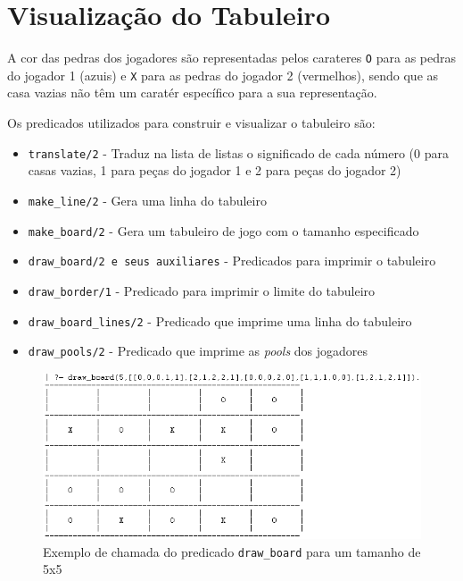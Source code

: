 \documentclass[a4paper]{article}
\begin{document}
\section{Visualização do Tabuleiro}

A cor das pedras dos jogadores são representadas pelos carateres \texttt{O} para as pedras do jogador 1 (azuis) e \texttt{X} para as pedras do jogador 2 (vermelhos), sendo que as casa vazias não têm um caratér específico para a sua representação.

Os predicados utilizados para construir e visualizar o tabuleiro são:

\begin{itemize}
	\item \texttt{translate/2} - Traduz na lista de listas o significado de cada número (0 para casas vazias, 1 para peças do jogador 1 e 2 para peças do jogador 2)
	\item \texttt{make\_line/2} - Gera uma linha do tabuleiro
	\item \texttt{make\_board/2} - Gera um tabuleiro de jogo com o tamanho especificado
	\item \texttt{draw\_board/2 e seus auxiliares} - Predicados para imprimir o tabuleiro
	\item \texttt{draw\_border/1} - Predicado para imprimir o limite do tabuleiro
	\item \texttt{draw\_board\_lines/2} - Predicado que imprime uma linha do tabuleiro
	\item \texttt{draw\_pools/2} - Predicado que imprime as \textit{pools} dos jogadores
\end{itemize}

\begin{figure}[!htb]
	\centering
	\includegraphics[scale=0.8]{images/draw_board.png}
	\caption{Exemplo de chamada do predicado \texttt{draw\_board} para um tamanho de 5x5}
\end{figure}
\end{document}
